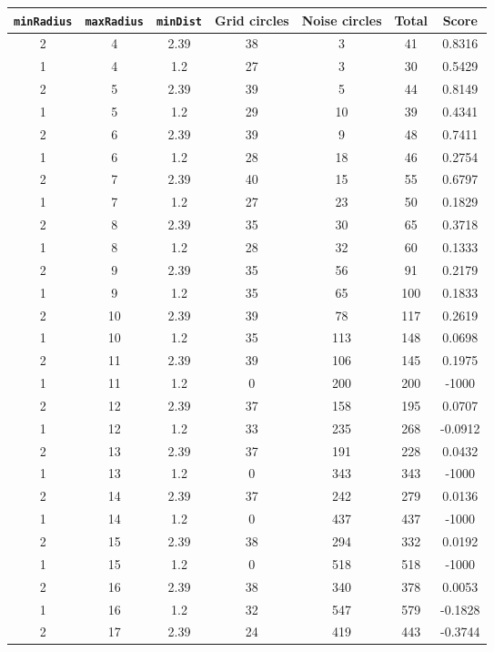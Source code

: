 \documentclass[letterpaper, 12pt]{article}
\begin{document}
\begin{longtable}{|c|c|c|c|c|c|c|}
\hline
\textbf{\texttt{minRadius}} & \textbf{\texttt{maxRadius}} & \textbf{\texttt{minDist}} & \textbf{Grid circles} & \textbf{Noise circles} & \textbf{Total} & \textbf{Score} \\
\hline
2 & 4 & 2.39 & 38 & 3 & 41 & 0.8316 \\
\hline
1 & 4 & 1.2 & 27 & 3 & 30 & 0.5429 \\
\hline
2 & 5 & 2.39 & 39 & 5 & 44 & 0.8149 \\
\hline
1 & 5 & 1.2 & 29 & 10 & 39 & 0.4341 \\
\hline
2 & 6 & 2.39 & 39 & 9 & 48 & 0.7411 \\
\hline
1 & 6 & 1.2 & 28 & 18 & 46 & 0.2754 \\
\hline
2 & 7 & 2.39 & 40 & 15 & 55 & 0.6797 \\
\hline
1 & 7 & 1.2 & 27 & 23 & 50 & 0.1829 \\
\hline
2 & 8 & 2.39 & 35 & 30 & 65 & 0.3718 \\
\hline
1 & 8 & 1.2 & 28 & 32 & 60 & 0.1333 \\
\hline
2 & 9 & 2.39 & 35 & 56 & 91 & 0.2179 \\
\hline
1 & 9 & 1.2 & 35 & 65 & 100 & 0.1833 \\
\hline
2 & 10 & 2.39 & 39 & 78 & 117 & 0.2619 \\
\hline
1 & 10 & 1.2 & 35 & 113 & 148 & 0.0698 \\
\hline
2 & 11 & 2.39 & 39 & 106 & 145 & 0.1975 \\
\hline
1 & 11 & 1.2 & 0 & 200 & 200 & -1000 \\
\hline
2 & 12 & 2.39 & 37 & 158 & 195 & 0.0707 \\
\hline
1 & 12 & 1.2 & 33 & 235 & 268 & -0.0912 \\
\hline
2 & 13 & 2.39 & 37 & 191 & 228 & 0.0432 \\
\hline
1 & 13 & 1.2 & 0 & 343 & 343 & -1000 \\
\hline
2 & 14 & 2.39 & 37 & 242 & 279 & 0.0136 \\
\hline
1 & 14 & 1.2 & 0 & 437 & 437 & -1000 \\
\hline
2 & 15 & 2.39 & 38 & 294 & 332 & 0.0192 \\
\hline
1 & 15 & 1.2 & 0 & 518 & 518 & -1000 \\
\hline
2 & 16 & 2.39 & 38 & 340 & 378 & 0.0053 \\
\hline
1 & 16 & 1.2 & 32 & 547 & 579 & -0.1828 \\
\hline
2 & 17 & 2.39 & 24 & 419 & 443 & -0.3744 \\

\end{longtable}
\end{document}
